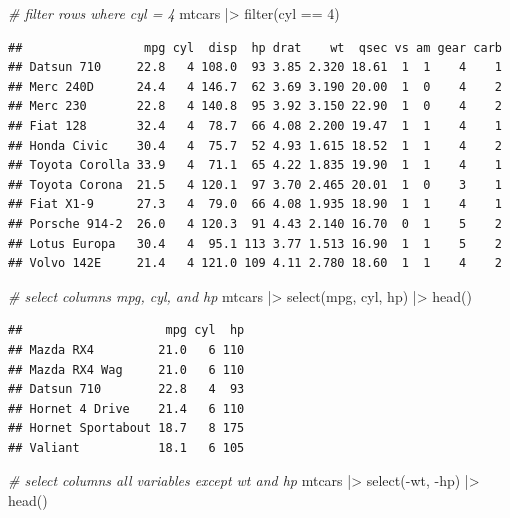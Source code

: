 \documentclass[
  12pt,
  oneside]{book}
\newenvironment{Shaded}{\begin{snugshade}}{\end{snugshade}}
\newcommand{\CommentTok}[1]{\textcolor[rgb]{0.56,0.35,0.01}{\textit{#1}}}
\newcommand{\DecValTok}[1]{\textcolor[rgb]{0.00,0.00,0.81}{#1}}
\newcommand{\FunctionTok}[1]{\textcolor[rgb]{0.00,0.00,0.00}{#1}}
\newcommand{\NormalTok}[1]{#1}
\newcommand{\SpecialCharTok}[1]{\textcolor[rgb]{0.00,0.00,0.00}{#1}}
\theoremstyle{definition}
\theoremstyle{definition}
\theoremstyle{definition}
\theoremstyle{definition}
\theoremstyle{remark}
\begin{document}
\begin{Shaded}
\begin{Highlighting}[]
\CommentTok{\# filter rows where cyl = 4}
\NormalTok{mtcars }\SpecialCharTok{|\textgreater{}} 
  \FunctionTok{filter}\NormalTok{(cyl }\SpecialCharTok{==} \DecValTok{4}\NormalTok{)}
\end{Highlighting}
\end{Shaded}

\begin{verbatim}
##                 mpg cyl  disp  hp drat    wt  qsec vs am gear carb
## Datsun 710     22.8   4 108.0  93 3.85 2.320 18.61  1  1    4    1
## Merc 240D      24.4   4 146.7  62 3.69 3.190 20.00  1  0    4    2
## Merc 230       22.8   4 140.8  95 3.92 3.150 22.90  1  0    4    2
## Fiat 128       32.4   4  78.7  66 4.08 2.200 19.47  1  1    4    1
## Honda Civic    30.4   4  75.7  52 4.93 1.615 18.52  1  1    4    2
## Toyota Corolla 33.9   4  71.1  65 4.22 1.835 19.90  1  1    4    1
## Toyota Corona  21.5   4 120.1  97 3.70 2.465 20.01  1  0    3    1
## Fiat X1-9      27.3   4  79.0  66 4.08 1.935 18.90  1  1    4    1
## Porsche 914-2  26.0   4 120.3  91 4.43 2.140 16.70  0  1    5    2
## Lotus Europa   30.4   4  95.1 113 3.77 1.513 16.90  1  1    5    2
## Volvo 142E     21.4   4 121.0 109 4.11 2.780 18.60  1  1    4    2
\end{verbatim}

\begin{Shaded}
\begin{Highlighting}[]
\CommentTok{\# select columns mpg, cyl, and hp}
\NormalTok{mtcars }\SpecialCharTok{|\textgreater{}} 
  \FunctionTok{select}\NormalTok{(mpg, cyl, hp) }\SpecialCharTok{|\textgreater{}} 
  \FunctionTok{head}\NormalTok{()}
\end{Highlighting}
\end{Shaded}

\begin{verbatim}
##                    mpg cyl  hp
## Mazda RX4         21.0   6 110
## Mazda RX4 Wag     21.0   6 110
## Datsun 710        22.8   4  93
## Hornet 4 Drive    21.4   6 110
## Hornet Sportabout 18.7   8 175
## Valiant           18.1   6 105
\end{verbatim}

\begin{Shaded}
\begin{Highlighting}[]
\CommentTok{\# select columns all variables except wt and hp}
\NormalTok{mtcars }\SpecialCharTok{|\textgreater{}} 
  \FunctionTok{select}\NormalTok{(}\SpecialCharTok{{-}}\NormalTok{wt, }\SpecialCharTok{{-}}\NormalTok{hp) }\SpecialCharTok{|\textgreater{}} 
  \FunctionTok{head}\NormalTok{()}
\end{Highlighting}
\end{Shaded}
\end{document}

